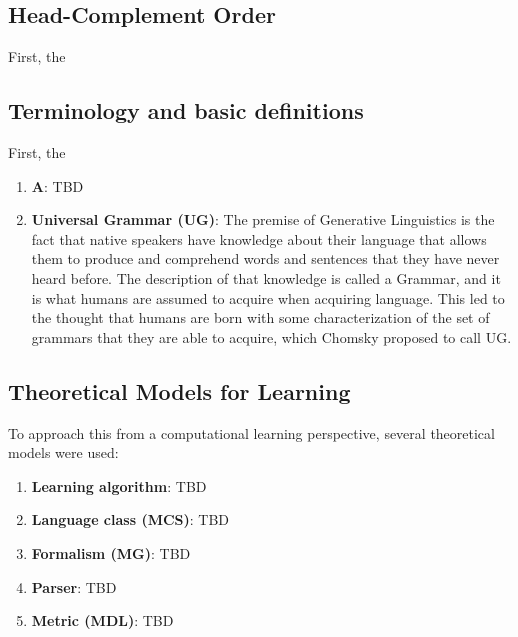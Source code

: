 \documentclass{article}
\begin{document}
\subsection{Head-Complement Order} %

First, the 

\subsection{Terminology and basic definitions} %
First, the 
\begin{enumerate}
  \item \textbf{A}: TBD
  \item \textbf{Universal Grammar (UG)}: The premise of Generative Linguistics is the fact that native speakers have knowledge about
their language that allows them to produce and comprehend words and sentences that they have never heard before. The description of that knowledge is called a Grammar, and it is what humans are assumed to acquire when acquiring language. This led to the thought that humans are born with some characterization of the set of grammars that they are able to acquire,  which Chomsky proposed to call UG.
\end{enumerate}

\subsection{Theoretical Models for Learning} %
To approach this from a computational learning perspective, several theoretical models were used:
\begin{enumerate}
  \item \textbf{Learning algorithm}: TBD
  \item \textbf{Language class (MCS)}: TBD
  \item \textbf{Formalism (MG)}: TBD
  \item \textbf{Parser}: TBD
  \item \textbf{Metric (MDL)}: TBD
\end{enumerate}

\end{document}
